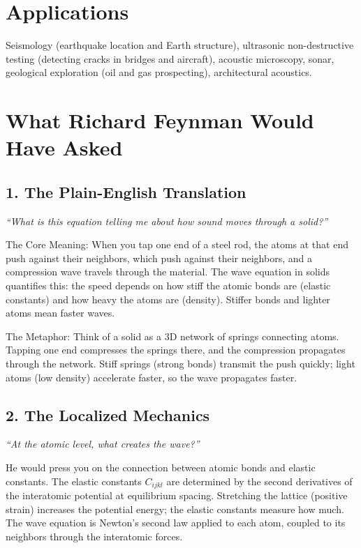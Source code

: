 \section*{Applications}

Seismology (earthquake location and Earth structure), ultrasonic non-destructive testing (detecting cracks in bridges and aircraft), acoustic microscopy, sonar, geological exploration (oil and gas prospecting), architectural acoustics.
\section*{What Richard Feynman Would Have Asked}

\subsection*{1. The Plain-English Translation}
\textit{``What is this equation telling me about how sound moves through a solid?''}

The Core Meaning: When you tap one end of a steel rod, the atoms at that end push against their neighbors, which push against their neighbors, and a compression wave travels through the material. The wave equation in solids quantifies this: the speed depends on how stiff the atomic bonds are (elastic constants) and how heavy the atoms are (density). Stiffer bonds and lighter atoms mean faster waves.

The Metaphor: Think of a solid as a 3D network of springs connecting atoms. Tapping one end compresses the springs there, and the compression propagates through the network. Stiff springs (strong bonds) transmit the push quickly; light atoms (low density) accelerate faster, so the wave propagates faster.

\subsection*{2. The Localized Mechanics}
\textit{``At the atomic level, what creates the wave?''}

He would press you on the connection between atomic bonds and elastic constants. The elastic constants $C_{ijkl}$ are determined by the second derivatives of the interatomic potential at equilibrium spacing. Stretching the lattice (positive strain) increases the potential energy; the elastic constants measure how much. The wave equation is Newton's second law applied to each atom, coupled to its neighbors through the interatomic forces.

